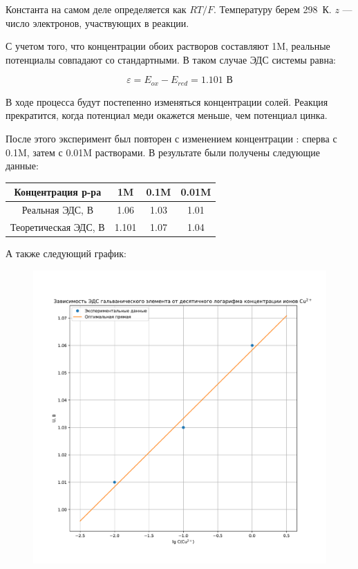 \documentclass[a4paper, 12pt]{article}
\begin{document}
Константа на самом деле определяется как $RT / F$. Температуру берем 298~К. $z$ --- число электронов, участвующих в реакции.

С учетом того, что концентрации обоих растворов составляют 1M, реальные потенциалы совпадают со стандартными. В таком случае ЭДС системы равна:

\begin{equation}
	\varepsilon = E_{ox} - E_{red} = 1.101 \text{ В}
\end{equation}

В ходе процесса будут постепенно изменяться концентрации солей. Реакция прекратится, когда потенциал меди окажется меньше, чем потенциал цинка.

После этого эксперимент был повторен с изменением концентрации : сперва с 0.1M, затем с 0.01M растворами. В результате были получены следующие данные:

\begin{center}
\begin{tabular}{|c|c|c|c|}
	\hline
	Концентрация р-ра \ce{CuSO4} & 1M & 0.1M & 0.01M \\
	\hline
	Реальная ЭДС, В & 1.06 & 1.03 & 1.01 \\
	\hline
	Теоретическая  ЭДС, В & 1.101 & 1.07 & 1.04 \\
	\hline
\end{tabular}
\end{center}

А также следующий график:

\begin{figure}[H]
	\centering
	\includegraphics[width=0.7\linewidth]{eds}
\end{figure}
\end{document}
